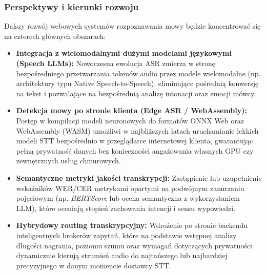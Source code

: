 \subsubsection{Perspektywy i kierunki rozwoju}

Dalszy rozwój webowych systemów rozpoznawania mowy będzie koncentrować się na czterech głównych obszarach:

\begin{itemize}
    \item \textbf{Integracja z wielomodalnymi dużymi modelami językowymi (Speech LLMs):} Nowoczesna ewolucja ASR zmierza w stronę bezpośredniego przetwarzania tokenów audio przez modele wielomodalne (np. architektury typu Native Speech-to-Speech), eliminujące pośrednią konwersję na tekst i pozwalające na bezpośrednią analizę intonacji oraz emocji mówcy.
    \item \textbf{Detekcja mowy po stronie klienta (Edge ASR / WebAssembly):} Postęp w kompilacji modeli neuronowych do formatów ONNX Web oraz WebAssembly (WASM) umożliwi w najbliższych latach uruchamianie lekkich modeli STT bezpośrednio w przeglądarce internetowej klienta, gwarantując pełną prywatność danych bez konieczności angażowania własnych GPU czy zewnętrznych usług chmurowych.
    \item \textbf{Semantyczne metryki jakości transkrypcji:} Zastąpienie lub uzupełnienie wskaźników WER/CER metrykami opartymi na podwójnym zanurzaniu pojęciowym (np. \textit{BERTScore} lub ocena semantyczna z wykorzystaniem LLM), które oceniają stopień zachowania intencji i sensu wypowiedzi.
    \item \textbf{Hybrydowy routing transkrypcyjny:} Wdrożenie po stronie backendu inteligentnych brokerów zapytań, które na podstawie wstępnej analizy długości nagrania, poziomu szumu oraz wymagań dotyczących prywatności dynamicznie kierują strumień audio do najtańszego lub najbardziej precyzyjnego w danym momencie dostawcy STT.
\end{itemize}
